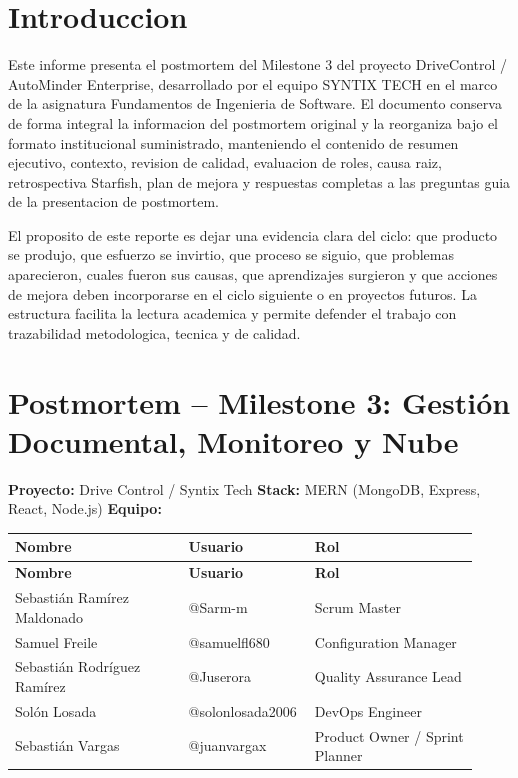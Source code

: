 \documentclass[11pt,a4paper]{article}
\begin{document}
\clearpage
{}
\tableofcontents
\clearpage

\clearpage
\section{Introduccion}

Este informe presenta el postmortem del Milestone 3 del proyecto DriveControl / AutoMinder Enterprise, desarrollado por el equipo SYNTIX TECH en el marco de la asignatura Fundamentos de Ingenieria de Software. El documento conserva de forma integral la informacion del postmortem original y la reorganiza bajo el formato institucional suministrado, manteniendo el contenido de resumen ejecutivo, contexto, revision de calidad, evaluacion de roles, causa raiz, retrospectiva Starfish, plan de mejora y respuestas completas a las preguntas guia de la presentacion de postmortem.

El proposito de este reporte es dejar una evidencia clara del ciclo: que producto se produjo, que esfuerzo se invirtio, que proceso se siguio, que problemas aparecieron, cuales fueron sus causas, que aprendizajes surgieron y que acciones de mejora deben incorporarse en el ciclo siguiente o en proyectos futuros. La estructura facilita la lectura academica y permite defender el trabajo con trazabilidad metodologica, tecnica y de calidad.

\clearpage
\section{Postmortem -- Milestone 3: Gestión Documental, Monitoreo y Nube}
\textbf{Proyecto:} Drive Control / Syntix Tech
\textbf{Stack:} MERN (MongoDB, Express, React, Node.js)
\textbf{Equipo:}

\begingroup
\scriptsize
\setlength{\tabcolsep}{3pt}
\begin{longtable}{P{0.36\linewidth}P{0.22\linewidth}P{0.34\linewidth}}
\toprule
\textbf{Nombre} & \textbf{Usuario} & \textbf{Rol} \\
\midrule
\endfirsthead
\toprule
\textbf{Nombre} & \textbf{Usuario} & \textbf{Rol} \\
\midrule
\endhead
\bottomrule
\endlastfoot
Sebastián Ramírez Maldonado & @Sarm-m & Scrum Master \\
Samuel Freile & @samuelfl680 & Configuration Manager \\
Sebastián Rodríguez Ramírez & @Juserora & Quality Assurance Lead \\
Solón Losada & @solonlosada2006 & DevOps Engineer \\
Sebastián Vargas & @juanvargax & Product Owner / Sprint Planner \\
\end{longtable}
\endgroup
\end{document}
